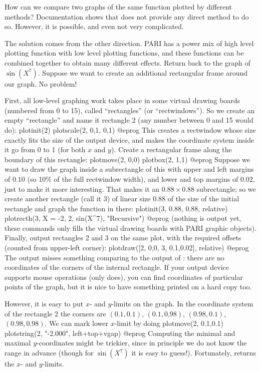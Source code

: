 How can we compare two graphs of the same function plotted by different
methods?  Documentation shows that  does not provide any direct
method to do so.  However, it is possible, and even not very complicated.

The solution comes from the other direction.  PARI has a power mix of high
level plotting function with low level plotting functions, and these functions
can be combined together to obtain many different effects.  Return back
to the graph of $\sin(X^7)$.  Suppose we want to create an additional
rectangular frame around our graph.  No problem!

First, all low-level graphing work takes place in some virtual drawing
boards (numbered from 0 to 15), called ``rectangles'' (or ``rectwindows'').
So we create an empty ``rectangle'' and name it rectangle 2 (any
number between 0 and 15 would do):
\bprog
  plotinit(2)
  plotscale(2, 0,1, 0,1)
@eprog
This creates a rectwindow whose size exactly fits the size of the output
device, and makes the coordinate system inside it go from 0 to 1 (for both
$x$ and $y$). Create a rectangular frame along the boundary of this rectangle:
\bprog
  plotmove(2, 0,0)
  plotbox(2, 1,1)
@eprog
Suppose we want to draw the graph inside a subrectangle of this with upper
and left margins of $0.10$ (so 10\% of the full rectwindow width), and
lower and top margins of $0.02$, just to make it more interesting. That
makes it an $0.88 \times 0.88$ subrectangle; so we create another rectangle
(call it 3) of linear size 0.88 of the size of the initial rectangle and
graph the function in there:
\bprog
  plotinit(3, 0.88, 0.88, relative)
  plotrecth(3, X = -2, 2, sin(X^7), "Recursive")
@eprog
(nothing is output yet, these commands only fills the virtual drawing
boards with PARI graphic objects). Finally, output rectangles 2 and 3 on
the same plot, with the required offsets (counted from upper-left corner):
\bprog
  plotdraw([2, 0,0,  3, 0.1,0.02], relative)
@eprog
\noindent The output misses something comparing to the output of
: there are no coordinates of the corners of the internal
rectangle.  If your output device supports mouse operations (only
 does), you can find coordinates of particular points of the
graph, but it is nice to have something printed on a hard copy too.

However, it is easy to put $x$- and $y$-limits on the graph.  In the
coordinate system of the rectangle 2 the corners are $(0.1,0.1)$,
$(0.1,0.98)$, $(0.98,0.1)$, $(0.98,0.98)$.  We can mark lower $x$-limit by
doing
\bprog
  plotmove(2, 0.1,0.1)
  plotstring(2, "-2.000", left+top+vgap)
@eprog\noindent
Computing the minimal and maximal $y$-coordinates might be trickier, since
in principle we do not know the range in advance (though for $\sin(X^7)$ it
is easy to guess!). Fortunately,  returns the $x$- and
$y$-limits.

